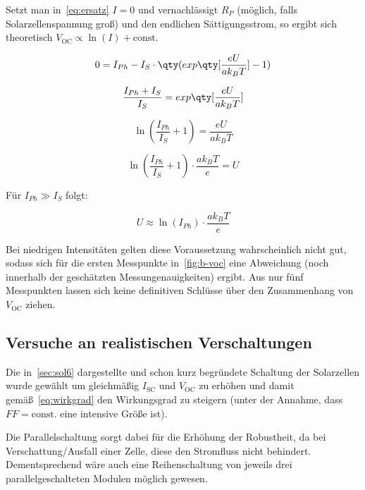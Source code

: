 \documentclass[slug=SZ, room=Hermann-Krone-Bau\,\ Labor\ 1.25, supervisor=Martin\ Kroll]{../../Lab_Report_LaTeX/lab_report}
\newcommand{\voc}{V_{\text{OC}}}
\newcommand{\isc}{I_{\text{SC}}}
\begin{document}
Setzt man in~\ref{eq:ersatz} \(I=0\) und vernachl\"assigt \(R_P\)
(m\"oglich, falls Solarzellenspannung gro\ss{}) und den endlichen
S\"attigungsstrom, so ergibt sich theoretisch
\(\voc\propto\ln(I) + \text{const}\).

\begin{equation}
        0 = I_{Ph} - I_S \cdot \qty(exp\qty[\frac{eU}{ak_BT}]-1)
\end{equation}

\begin{equation}
        \frac{I_{Ph}+I_S}{I_S} =  exp\qty[\frac{eU}{ak_BT}]
\end{equation}

\begin{equation}
        \ln(\frac{I_{Ph}}{I_S}+1) = \frac{eU}{ak_BT}
\end{equation}

\begin{equation}
        \ln(\frac{I_{Ph}}{I_S}+1) \cdot \frac{ak_BT}{e} = U
\end{equation}

Für \(I_{Ph} \gg I_S\) folgt:

\begin{equation}\label{eq:iphgross}
          U \approx \ln(I_{Ph}) \cdot \frac{ak_BT}{e}
\end{equation}

Bei niedrigen
Intensit\"aten gelten diese Voraussetzung wahrscheinlich nicht gut,
sodass sich f\"ur die ersten Messpunkte in~\ref{fig:b-voc} eine
Abweichung (noch innerhalb der gesch\"atzten Messungenauigkeiten)
ergibt. Aus nur f\"unf Messpunkten lassen sich keine definitiven
Schl\"usse \"uber den Zusammenhang von \(\voc\) ziehen.

\subsection{Versuche an realistischen Verschaltungen}
\label{sec:auswc}
Die in~\ref{sec:sol6} dargestellte und schon kurz begr\"undete
Schaltung der Solarzellen wurde gew\"ahlt um gleichm\"a\ss{}ig
\(\isc\) und \(\voc\) zu erh\"ohen und damit
gem\"a\ss{}~\ref{eq:wirkgrad} den Wirkungsgrad zu steigern (unter der
Annahme, dass \(FF=\text{const.}\) eine intensive Gr\"o\ss{}e ist).

Die Parallelschaltung sorgt dabei f\"ur die Erh\"ohung der Robustheit,
da bei Verschattung/Ausfall einer Zelle, diese den Stromfluss nicht
behindert. Dementsprechend w\"are auch eine Reihenschaltung von
jeweils drei parallelgeschalteten Modulen m\"oglich gewesen.
\end{document}
